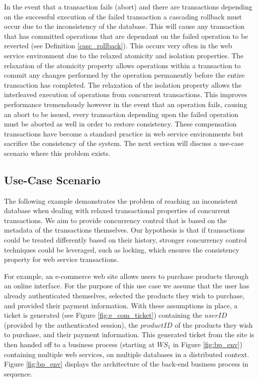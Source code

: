 \documentclass[conference]{IEEEtran}
\begin{document}
In the event that a transaction fails (abort) and there are transactions depending on the successful execution of the failed transaction a cascading rollback must occur due to the inconsistency of the database. This will cause any transaction that has committed operations that are dependant on the failed operation to be reverted (see Definition \ref{casc_rollback}). This occurs very often in the web service environment due to the relaxed atomicity and isolation properties. The relaxation of the atomicity property allows operations within a transaction to commit any changes performed by the operation permanently before the entire transaction has completed. The relaxation of the isolation property allows the interleaved execution of operations from concurrent transactions. This improves performance tremendously however in the event that an operation fails, causing an abort to be issued, every transaction depending upon the failed operation must be aborted as well in order to restore consistency. These compensation transactions have become a standard practice in web service environments but sacrifice the consistency of the system. The next section will discuss a use-case scenario where this problem exists.

\subsection{Use-Case Scenario}
The following example demonstrates the problem of reaching an inconsistent database when dealing with relaxed transactional properties of concurrent transactions. We aim to provide concurrency control that is based on the metadata of the transactions themselves. Our hypothesis is that if transactions could be treated differently based on their history, stronger concurrency control techniques could be leveraged, such as locking, which ensures the consistency property for web service transactions.

For example, an e-commerce web site allows users to purchase products through an online interface. For the purpose of this use case we assume that the user has already authenticated themselves, selected the products they wish to purchase, and provided their payment information. With these assumptions in place, a ticket is generated (see Figure \ref{fig:e_com_ticket}) containing the $userID$ (provided by the authenticated session), the $productID$ of the products they wish to purchase, and their payment information. This generated ticket from the site is then handed off to a business process (starting at $WS_{1}$ in Figure \ref{fig:bp_env}) containing multiple web services, on multiple databases in a distributed context. Figure \ref{fig:bp_env} displays the architecture of the back-end business process in sequence.
\end{document}

